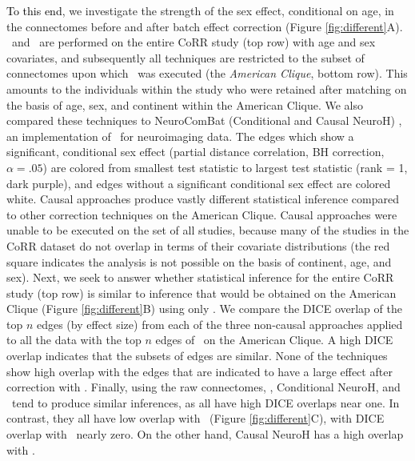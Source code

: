 \textcolor{black}{To this end}, we investigate the strength of the sex effect, conditional on age, in the connectomes before and after batch effect correction (Figure \ref{fig:different}A). \Combat~and \cCombat~are performed on the entire CoRR study (top row) with age and sex covariates, and subsequently all techniques are restricted to the subset of connectomes upon which \cccombat~was executed (the \textit{American Clique}, bottom row). This amounts to the individuals within the study who were retained after matching on the basis of age, sex, and continent within the American Clique. We also compared these techniques to NeuroComBat (Conditional and Causal NeuroH) \cite{Fortin2018Feb,Pomponio2020Mar}, an implementation of \Combat~for neuroimaging data. The edges which show a significant, conditional sex effect (partial distance correlation, BH correction, $\alpha=.05$) are colored from smallest test statistic to largest test statistic (rank = 1, dark purple), and edges without a significant conditional sex effect are colored white. Causal approaches produce vastly different statistical inference compared to other correction techniques on the American Clique. Causal approaches were unable to be executed on the set of all studies, because many of the studies in the CoRR dataset do not overlap in terms of their covariate distributions (the red square indicates the analysis is not possible on the basis of continent, age, and sex). Next, we seek to answer whether statistical inference for the entire CoRR study (top row) is similar to inference that would be obtained on the American Clique (Figure \ref{fig:different}B) using only \cccombat. We compare the DICE overlap of the top $n$ edges (by effect size) from each of the three non-causal approaches applied to all the data with the top $n$ edges of \cccombat~on the American Clique. A high DICE overlap indicates that the subsets of edges are similar.  None of the techniques show high overlap with the edges that are indicated to have a large effect after correction with \cccombat. Finally, using the raw connectomes, \Combat, Conditional NeuroH, and \ccombat~tend to produce similar inferences, as all have high DICE overlaps near one.  In contrast, they all have low overlap with \cccombat~(Figure \ref{fig:different}C), with DICE overlap with \cccombat~nearly zero. On the other hand, Causal NeuroH has a high overlap with \cccombat. 

